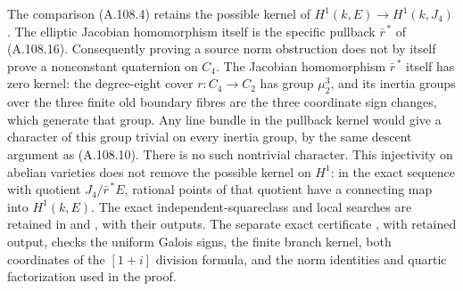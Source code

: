 The comparison (A.108.4) retains the possible kernel of
$H^1(k,E)\to H^1(k,J_4)$.
The elliptic Jacobian homomorphism itself is the
specific pullback $\bar r^{\,*}$ of (A.108.16).
Consequently proving a source norm obstruction does
not by itself prove a nonconstant quaternion on $C_4$.
The Jacobian homomorphism $\bar r^{\,*}$ itself has
zero kernel: the degree-eight cover $r:C_4\to C_2$
has group $\mu_2^3$, and its inertia groups over the
three finite old boundary fibres are the three
coordinate sign changes, which generate that group.
Any line bundle in the pullback kernel would give
a character of this group trivial on every inertia
group, by the same descent argument as (A.108.10).
There is no such nontrivial character.
This injectivity on abelian varieties does not
remove the possible kernel on $H^1$: in the exact
sequence with quotient $J_4/\bar r^{\,*}E$, rational
points of that quotient have a connecting map into
$H^1(k,E)$.
The exact independent-squareclass and local searches
are retained in
 and
,
with their outputs.
The separate exact certificate
,
with retained output, checks the uniform Galois signs,
the finite branch kernel, both coordinates of the
$[1+i]$ division formula, and the norm identities
and quartic factorization used in the proof.
